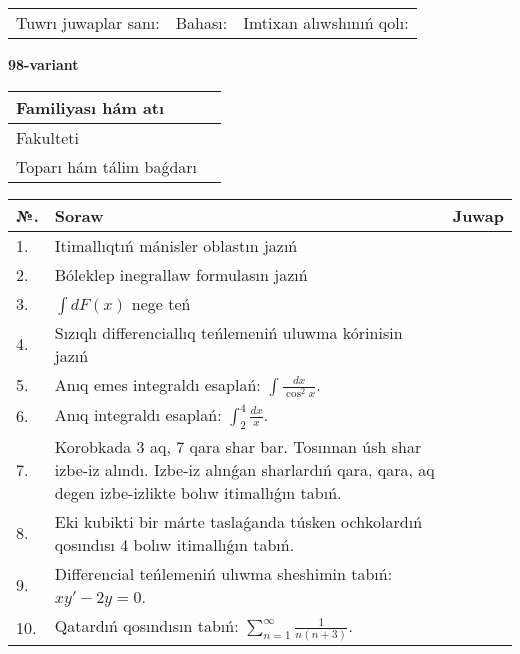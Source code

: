\documentclass{article}
\begin{document}
\vspace{1cm}

\begin{tabular}{ c c c }
Tuwrı juwaplar sanı: \underline{\hspace{2cm}} & Bahası: \underline{\hspace{2cm}} & Imtixan alıwshınıń qolı: \underline{\hspace{2cm}} \\
\end{tabular}

\newpage

\begin{center}\textbf{98-variant}\end{center}

\bgroup
\def\arraystretch{1.5}
\begin{tabular}{ |m{6cm}|m{10cm}| }
  \hline
  Familiyası hám atı & \\
  \hline
  Fakulteti &\\
  \hline
  Toparı hám tálim baǵdarı & \\
  \hline
\end{tabular}
\egroup

\vspace{0.5cm}

\bgroup
\def\arraystretch{2}
\begin{tabular}{ |l|m{8cm}|m{7cm}| }
  \hline
  №. & Soraw & Juwap \\
  \hline
  1. & Itimallıqtıń mánisler oblastın jazıń &  \\
  \hline
  2. & Bóleklep inegrallaw formulasın jazıń &  \\
  \hline
  3. & $\displaystyle\int dF(x)$ nege teń &  \\
  \hline
  4. & Sızıqlı differenciallıq teńlemeniń uluwma kórinisin jazıń &  \\
  \hline
  5. & Anıq emes integraldı esaplań: $\displaystyle\int \frac{dx}{\cos^{2}x}$. &  \\
  \hline
  6. & Anıq integraldı esaplań: $\displaystyle\int_{2}^{4}\frac{dx}{x}$. &  \\
  \hline
  7. & Korobkada 3 aq, 7 qara shar bar. Tosınnan úsh shar izbe-iz alındı. Izbe-iz alınǵan sharlardıń qara, qara, aq degen izbe-izlikte bolıw itimallıǵın tabıń. &  \\
  \hline
  8. & Eki kubikti bir márte taslaǵanda túsken ochkolardıń qosındısı 4 bolıw itimallıǵın tabıń. &  \\
  \hline
  9. & Differencial teńlemeniń ulıwma sheshimin tabıń: $xy' - 2y = 0$. &  \\
  \hline
  10. & Qatardıń qosındısın tabıń: $\displaystyle\sum_{n = 1}^{\infty}\frac{1}{n(n + 3)}$. &  \\
  \hline
\end{tabular}
\egroup
\end{document}

